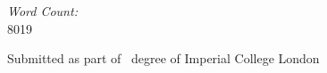 \begin{titlepage}
\vspace*{2em}
\begin{center}
	\emph{Word Count:}\\
	8019
\end{center}

\vfill %
Submitted as part of 
\degreetype~degree of Imperial College London\\[0.5cm]

\makeatletter
\@date 
\makeatother


\end{titlepage}
